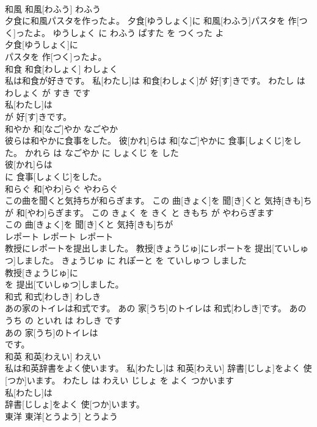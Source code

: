 \documentclass[8pt]{extreport}
\begin{document}
\begin{CJK}{UTF8}{min}
\\	和風	和風[わふう]	わふう	
\\	夕食に和風パスタを作ったよ。	夕食[ゆうしょく]に 和風[わふう]パスタを 作[つく]ったよ。	ゆうしょく に わふう ぱすた を つくった よ	
\\	夕食[ゆうしょく]に
\\	パスタを 作[つく]ったよ。			
\\	和食	和食[わしょく]	わしょく	
\\	私は和食が好きです。	私[わたし]は 和食[わしょく]が 好[す]きです。	わたし は わしょく が すき です	
\\	私[わたし]は
\\	が 好[す]きです。			
\\	和やか	和[なご]やか	なごやか	
\\	彼らは和やかに食事をした。	彼[かれ]らは 和[なご]やかに 食事[しょくじ]をした。	かれら は なごやか に しょくじ を した	
\\	彼[かれ]らは
\\	に 食事[しょくじ]をした。			
\\	和らぐ	和[やわ]らぐ	やわらぐ	
\\	この曲を聞くと気持ちが和らぎます。	この 曲[きょく]を 聞[き]くと 気持[きも]ちが 和[やわ]らぎます。	この きょく を きく と きもち が やわらぎます	
\\	この 曲[きょく]を 聞[き]くと 気持[きも]ちが
\\	レポート	レポート	レポート	
\\	教授にレポートを提出しました。	教授[きょうじゅ]にレポートを 提出[ていしゅつ]しました。	きょうじゅ に れぽーと を ていしゅつ しました	
\\	教授[きょうじゅ]に
\\	を 提出[ていしゅつ]しました。			
\\	和式	和式[わしき]	わしき	
\\	あの家のトイレは和式です。	あの 家[うち]のトイレは 和式[わしき]です。	あの うち の といれ は わしき です	
\\	あの 家[うち]のトイレは
\\	です。			
\\	和英	和英[わえい]	わえい	
\\	私は和英辞書をよく使います。	私[わたし]は 和英[わえい] 辞書[じしょ]をよく 使[つか]います。	わたし は わえい じしょ を よく つかいます	
\\	私[わたし]は
\\	辞書[じしょ]をよく 使[つか]います。			
\\	東洋	東洋[とうよう]	とうよう	

\end{CJK}
\end{document}
